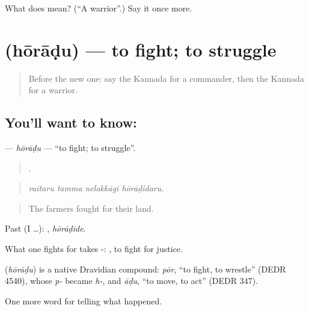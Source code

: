 \begin{tcolorbox}[breakable,colback=teal!4,colframe=teal!35!black,title={Before you move on}]
What does  mean? (\textquotedblleft{}A warrior\textquotedblright{}.) Say it once more.
\end{tcolorbox}
\section[\texorpdfstring{\kn{ಹೋರಾಡು} (hōrāḍu)}{ಹೋರಾಡು (hōrāḍu)}]{ (hōrāḍu) — to fight; to struggle}

\label{lesson:KA-C336-horadu}



\begin{quote}
Before the new one: say the Kannada for a commander, then the Kannada for a warrior.
\end{quote}

\subsection*{You'll want to know: }
\textbf{} — \emph{hōrāḍu} — \textquotedblleft{}to fight; to struggle\textquotedblright{}.

\begin{quote}
   .
\end{quote}

\begin{quote}
\emph{raitaru tamma nelakkāgi hōrāḍidaru.}
\end{quote}

\begin{quote}
The farmers fought for their land.
\end{quote}

Past (I …): , \emph{hōrāḍide}.

What one fights for takes -:  , to fight for justice.

\begin{cousinweb}
\textbf{} (\emph{hōrāḍu}) is a native Dravidian compound: \emph{pōr}, \textquotedblleft{}to fight, to wrestle\textquotedblright{} (DEDR 4540), whose \emph{p-} became \emph{h-}, and \emph{āḍu}, \textquotedblleft{}to move, to act\textquotedblright{} (DEDR 347).
\end{cousinweb}

\begin{grammarlens}[title={What you've built}]
One more word for telling what happened.
\end{grammarlens}

